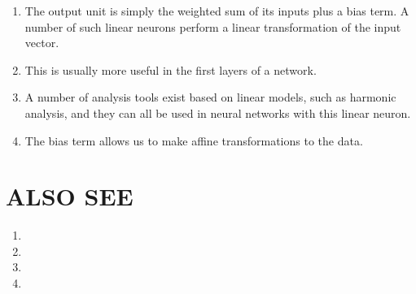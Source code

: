 \begin{enumerate}
    \item The output unit is simply the weighted sum of its inputs plus a bias term. A number of such linear neurons perform a linear transformation of the input vector. 
    \item This is usually more useful in the first layers of a network. 
    \item A number of analysis tools exist based on linear models, such as harmonic analysis, and they can all be used in neural networks with this linear neuron. 
    \item The bias term allows us to make affine transformations to the data.
\end{enumerate}







\section*{ALSO SEE}
\begin{enumerate}
    \item {}
    \item {}
    \item {}
    \item {}
\end{enumerate}



















































